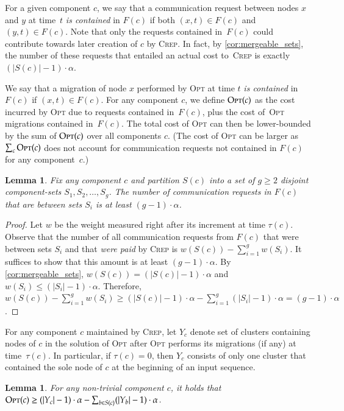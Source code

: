 \documentclass[11pt,a4paper]{scrartcl}
\newtheorem{lemma}[theorem]{Lemma}
\newcommand{\OPT}{\textsc{Opt}\xspace}
\newcommand{\CREP}{\textsc{Crep}\xspace}
\begin{document}
For a given component $c$, we say that a communication request between nodes
$x$ and $y$ at time~$t$ \emph{is contained} in $F(c)$ if both $(x,t) \in F(c)$
and $(y,t) \in F(c)$. Note that only the requests contained in~$F(c)$
could contribute towards later creation of $c$ by \CREP. In fact, by
\cref{cor:mergeable_sets}, the number of these requests that
entailed an actual cost to~\CREP is exactly $(|S(c)| - 1) \cdot \alpha$.

We say that a migration of node $x$ performed by \OPT at time $t$ \emph{is
contained} in~$F(c)$ if $(x,t) \in F(c)$. For any component $c$, we define
$\OPT(c)$ as the cost incurred by \OPT due to requests contained in~$F(c)$, 
plus the cost of~\OPT migrations contained in~$F(c)$. The total cost of \OPT
can then be lower-bounded by the sum of $\OPT(c)$ over all components $c$.
(The cost of \OPT can be larger as $\sum_c \OPT(c)$ does not account for 
communication requests not contained in $F(c)$ for any component~$c$.)

\begin{lemma}
\label{lem:merge_action_cut}
Fix any component $c$ and partition $S(c)$ into a set of $g \geq 2$ disjoint
component-sets $S_1, S_2, \ldots, S_g$. The number of communication requests
in $F(c)$ that are between sets $S_i$ is at least $(g-1) \cdot \alpha$.
\end{lemma}
\begin{proof}
Let $w$ be the weight measured right after its increment at time $\tau(c)$.
Observe that the number of all communication requests from $F(c)$ that were
between sets $S_i$ and that \emph{were paid} by \CREP is $w(S(c)) -
\sum_{i=1}^g w(S_i)$. It suffices to show that this amount is at least $(g-1)
\cdot \alpha$. By \cref{cor:mergeable_sets}, $w(S(c)) = (|S(c)|-1)
\cdot \alpha$ and $w(S_i) \leq (|S_i|-1) \cdot \alpha$. Therefore, $w(S(c)) -
\sum_{i=1}^g w(S_i) \geq (|S(c)|-1) \cdot \alpha - \sum_{i=1}^g (|S_i|-1)
\cdot \alpha = (g-1) \cdot \alpha$.
\end{proof}

For any component $c$ maintained by \CREP, let $Y_c$ denote set of clusters
containing nodes of $c$ in the solution of \OPT after \OPT performs its
migrations (if any) at time~$\tau(c)$. In particular, if $\tau(c) = 0$, then
$Y_c$ consists of only one cluster that contained the sole node of $c$ 
at the beginning of an input sequence.

\begin{lemma}
\label{lem:opt_recursive_bound}
For any non-trivial component $c$, it holds that $\OPT(c) \geq (|Y_c| - 1)
\cdot \alpha - \sum_{b \in S(c)} (|Y_b| - 1) \cdot \alpha$.
\end{lemma}
\end{document}
